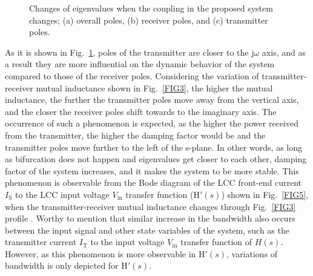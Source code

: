 \documentclass[journal,a4paper,10pt,twoside]{IEEEtran} %
\begin{document}
\begin{figure}
\begin{center}
{	    }
	    \vspace{-3mm}
	    \end{center}
	    \caption{Changes of eigenvalues when the coupling in the proposed system changes; (a) overall poles, (b) receiver poles, and (c) transmitter poles.}
	    \label{FIG4}
	    \vspace{-5mm}
	\end{figure}
	
	As it is shown in Fig.~\ref{FIG4}, poles of the transmitter are closer to the $\mathrm{j}\omega$ axis, and as a result they are more influential on the dynamic behavior of the system compared to those of the receiver poles.  Considering the variation of transmitter-receiver mutual inductance shown in Fig.~\ref{FIG3}, the higher the mutual inductance, the further the transmitter poles move away from the vertical axis, and the closer the receiver poles shift towards to the imaginary axis. The occurrence of such a phenomenon is expected, as the higher the power received from the transmitter, the higher the damping factor would be and the transmitter poles move further to the left of the s-plane. In other words, as long as bifurcation does not happen and eigenvalues get closer to each other, damping factor of the system increases, and it makes the system to be more stable. This phenomenon is observable from the Bode diagram of the LCC front-end current ${I}_\mathrm{S}$ to the LCC input voltage ${V}_{\mathrm{in}}$ transfer function ($\mathrm{H'}(s)$) shown in Fig.~\ref{FIG5}, when the transmitter-receiver mutual inductance changes through Fig.~\ref{FIG3} profile \cite{farajizadeh,bif}. {\color{blue}Worthy to mention that similar increase in the bandwidth also occurs between the input signal and other state variables of the system, such as the transmitter current $I_\mathrm{T}$ to the input voltage $V_\mathrm{in}$ transfer function of $\mathit{H}(s)$. However, as this phenomenon is more observable in $\mathrm{H'}(s)$, variations of bandwidth is only depicted for $\mathrm{H'}(s)$.}
\end{document}
